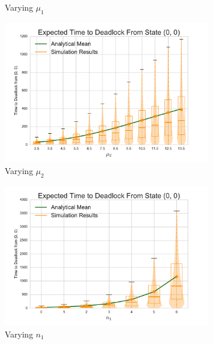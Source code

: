 \documentclass{article}
\numberwithin{equation}{section}
\begin{document}
\begin{center}
\begin{figure}[!htbp]
\begin{center}
\begin{subfigure}[b]{0.38\textwidth}
  \caption{Varying $\mu_1$}
  \label{fig:timestodeadlock2_mu1}
\end{subfigure}
\begin{subfigure}[b]{0.38\textwidth}
  \includegraphics[width=\textwidth]{images/varymu2}
  \caption{Varying $\mu_2$}
  \label{fig:timestodeadlock2_mu2}
\end{subfigure}
\begin{subfigure}[b]{0.38\textwidth}
  \includegraphics[width=\textwidth]{images/varyn1}
  \caption{Varying $n_1$}
  \label{fig:timestodeadlock2_n1}
\end{subfigure}
\begin{subfigure}[b]{0.38\textwidth}

\end{subfigure}
\end{center}
\end{figure}
\end{center}
\end{document}
